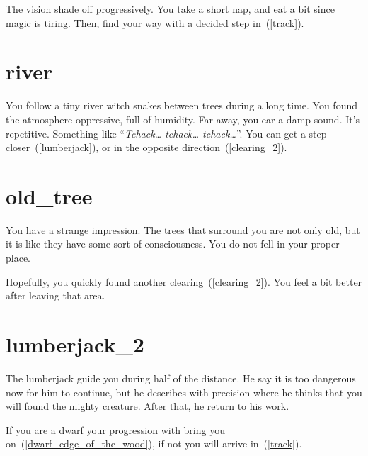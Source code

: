 The vision shade off progressively. You take a short nap, and eat a bit
since magic is tiring. Then, find your way with a decided step in~(\ref{track}).

\section{river}

You follow a tiny river witch snakes between trees during a long time. You found
the atmosphere oppressive, full of humidity. Far away, you ear a damp sound.
It's repetitive. Something like ``\textit{Tchack… tchack… tchack…}''. You can
get a step closer~(\ref{lumberjack}), or in the opposite
direction~(\ref{clearing_2}).

\section{old_tree}

You have a strange impression. The trees that surround you are not only old, but
it is like they have some sort of consciousness. You do not fell in your proper
place.

Hopefully, you quickly found another clearing~(\ref{clearing_2}). You feel a bit
better after leaving that area.

\section{lumberjack_2}

The lumberjack guide you during half of the distance. He say it is too dangerous
now for him to continue, but he describes with precision where he thinks that you
will found the mighty creature. After that, he return to his work.

If you are a dwarf your progression with bring you
on~(\ref{dwarf_edge_of_the_wood}), if not you will arrive in~(\ref{track}).
